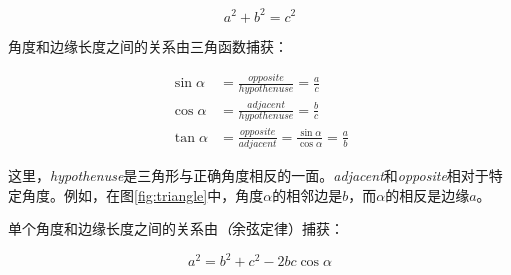 \begin{equation}
a^2+b^2=c^2
\end{equation}


角度和边缘长度之间的关系由三角函数捕获：

\begin{eqnarray}
\sin{\alpha}&=\frac{opposite}{hypothenuse}=\frac{a}{c}\\
\cos{\alpha}&=\frac{adjacent}{hypothenuse}=\frac{b}{c}\\
\tan{\alpha}&=\frac{opposite}{adjacent}=\frac{\sin{\alpha}}{\cos{\alpha}}=\frac{a}{b}
\end{eqnarray} 



这里，\emph{hypothenuse}是三角形与正确角度相反的一面。\emph{adjacent}和\emph{opposite}相对于特定角度。例如，在图\ref{fig:triangle}中，角度$\alpha$的相邻边是$b$，而$\alpha$的相反是边缘$a$。

单个角度和边缘长度之间的关系由\emph（余弦定律）捕获：

\begin{equation}
a^2=b^2+c^2-2bc\cos{\alpha}
\end{equation}


